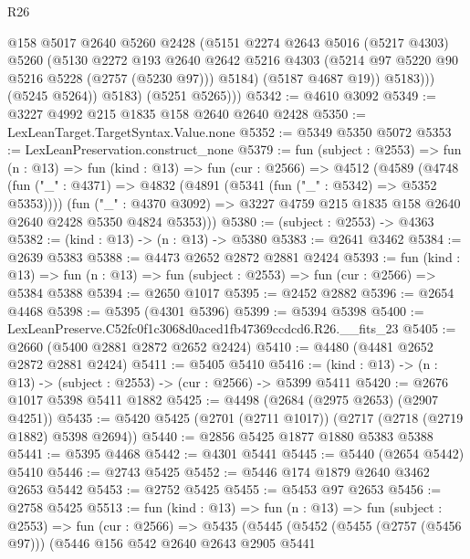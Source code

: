 \begin{lexlean}{R26}
\begin{coremodule}
                  @158
                  @5017
                  @2640
                  @5260
                  @2428
                  (@5151
                    @2274
                    @2643
                    @5016
                    (@5217 @4303)
                    @5260
                    (@5130
                      @2272
                      @193
                      @2640
                      @2642
                      @5216
                      @4303
                      (@5214 @97 @5220 @90 @5216 @5228 (@2757 (@5230 @97)))
                      @5184)
                    (@5187 @4687 @19))
                  @5183)))
            (@5245 @5264))
          @5183)
        (@5251 @5265)))
@5342 := @4610 @3092
@5349 := @3227 @4992 @215 @1835 @158 @2640 @2640 @2428
@5350 := LexLeanTarget.TargetSyntax.Value.none
@5352 := @5349 @5350 @5072
@5353 := LexLeanPreservation.construct_none
@5379 := fun (subject : @2553) =>
  fun (n : @13) =>
  fun (kind : @13) =>
  fun (cur : @2566) =>
  @4512
    (@4589
      (@4748
        (fun ("_" : @4371) => @4832 (@4891 (@5341 (fun ("_" : @5342) => @5352 @5353))))
        (fun ("_" : @4370 @3092) =>
        @3227 @4759 @215 @1835 @158 @2640 @2640 @2428 @5350 @4824 @5353)))
@5380 := (subject : @2553) -> @4363
@5382 := (kind : @13) -> (n : @13) -> @5380
@5383 := @2641 @3462
@5384 := @2639 @5383
@5388 := @4473 @2652 @2872 @2881 @2424
@5393 := fun (kind : @13) =>
  fun (n : @13) => fun (subject : @2553) => fun (cur : @2566) => @5384 @5388
@5394 := @2650 @1017
@5395 := @2452 @2882
@5396 := @2654 @4468
@5398 := @5395 (@4301 @5396)
@5399 := @5394 @5398
@5400 := LexLeanPreserve.C52fc0f1c3068d0aced1fb47369ccdcd6.R26.__fits_23
@5405 := @2660 (@5400 @2881 @2872 @2652 @2424)
@5410 := @4480 (@4481 @2652 @2872 @2881 @2424)
@5411 := @5405 @5410
@5416 := (kind : @13) -> (n : @13) -> (subject : @2553) -> (cur : @2566) -> @5399 @5411
@5420 := @2676 @1017 @5398 @5411 @1882
@5425 := @4498 (@2684 (@2975 @2653) (@2907 @4251))
@5435 := @5420 @5425 (@2701 (@2711 @1017)) (@2717 (@2718 (@2719 @1882) @5398 @2694))
@5440 := @2856 @5425 @1877 @1880 @5383 @5388
@5441 := @5395 @4468
@5442 := @4301 @5441
@5445 := @5440 (@2654 @5442) @5410
@5446 := @2743 @5425
@5452 := @5446 @174 @1879 @2640 @3462 @2653 @5442
@5453 := @2752 @5425
@5455 := @5453 @97 @2653
@5456 := @2758 @5425
@5513 := fun (kind : @13) =>
  fun (n : @13) =>
  fun (subject : @2553) =>
  fun (cur : @2566) =>
  @5435
    (@5445
      (@5452
        (@5455 (@2757 (@5456 @97)))
        (@5446
          @156
          @542
          @2640
          @2643
          @2905
          @5441

\end{coremodule}
\end{lexlean}
